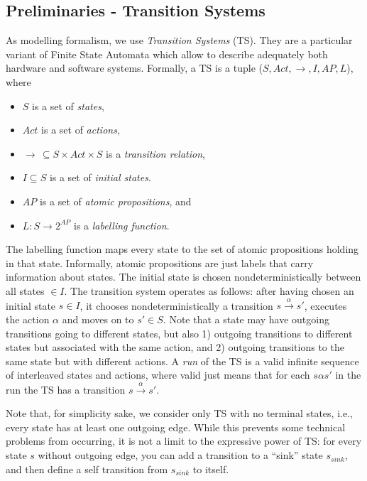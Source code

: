 \documentclass{article}
\begin{document}
\subsection{Preliminaries - Transition Systems}
\label{subsec-ts}
As modelling formalism, we use \emph{Transition Systems} (TS). They are a particular variant 
of Finite State Automata which allow to describe adequately both hardware and software systems. 
Formally, a TS is a tuple ($S, Act, \rightarrow, I, AP, L$), where 
\begin{itemize}
    \item $S$ is a set of \emph{states},
    \item $Act$ is a set of \emph{actions},
    \item $\rightarrow\,\subseteq S \times Act \times S$ is a \emph{transition relation},
    \item $I \subseteq S$ is a set of \emph{initial states}.
    \item $AP$ is a set of \emph{atomic propositions}, and 
    \item $L : S \rightarrow 2^{AP}$ is a \emph{labelling function}.
\end{itemize}
The labelling function maps every state to the set of atomic propositions holding in that state. 
Informally, atomic propositions are just labels that carry information about states.
The initial state is chosen nondeterministically between all states $\in I$.
The transition system operates as follows: after having chosen an initial state $s \in I$, it chooses 
nondeterministically a transition $s \xrightarrow{\alpha} s'$, 
executes the action $\alpha$ and moves on to $s' \in S$. Note that a state may have outgoing transitions 
going to different states, but also 1) outgoing transitions to different states but associated with the same action, and
2) outgoing transitions to the same state but with different actions.
A \emph{run} of the TS is a valid infinite sequence of interleaved states and actions,
where valid just means that for each $s \alpha s'$ in the run the TS has a transition $s \xrightarrow{\alpha} s'$.

Note that, for simplicity sake, we consider only TS with no terminal states, i.e., 
every state has at least one outgoing edge. 
While this prevents some technical problems from occurring, 
it is not a limit to the expressive power of TS: for every state $s$ without outgoing edge, 
you can add a transition to a ``sink'' state $s_ {sink}$, 
and then define a self transition from $s_ {sink}$ to itself.
\end{document}
